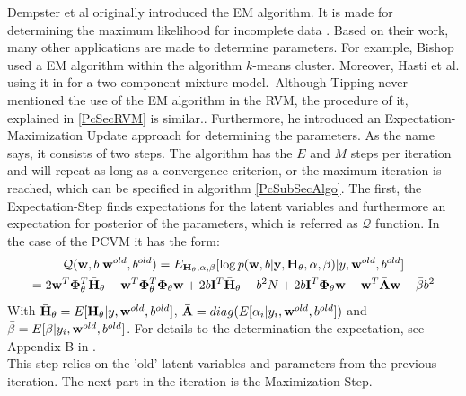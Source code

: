 Dempster et al originally introduced the EM algorithm. It is made for determining the maximum likelihood for incomplete data \cite{Dempster.1977}. 
Based on their work, many other applications are made to determine parameters.
For example, Bishop used a \acs{EM} algorithm within the algorithm $k$-means cluster.\cite[p. 426-428]{Bishop.2009}
Moreover, Hasti et al. using it in \cite[p. 272-276]{TrevorHastie.2009} for a two-component mixture model.\
Although Tipping never mentioned the use of the \acs{EM} algorithm in the \acs{RVM}, the procedure of it, explained in \ref{PcSecRVM} is similar.\cite[p. 233-234]{Tipping.2001}.
Furthermore, he introduced an Expectation-Maximization Update approach for determining the parameters.\cite[. 235]{Tipping.2001} \newline
As the name says, it consists of two steps.
The algorithm has the $E$ and $M$ steps per iteration and will repeat as long as a convergence criterion, or the maximum iteration is reached, which can be specified in algorithm \ref{PcSubSecAlgo}.
The first, the Expectation-Step finds expectations for the latent variables and furthermore an expectation for posterior of the parameters, which is referred as $\mathcal{Q}$ function.
In the case of the \acs{PCVM} it has the form:\cite{Chen.2009}
\begin{equation}\label{EqPcvmEStep}
\begin{gathered}
\mathcal{Q}(\mathbf{w},b\vert \mathbf{w}^{old},b^{old}) = E_{\mathbf{H}_{\theta},\alpha,\beta}[\log p (\mathbf{w},b \vert \mathbf{y} ,\mathbf{H}_{\theta},\alpha,\beta) | y,\mathbf{w}^{old},b^{old}]\\
= 2\mathbf{w}^T \mathbf{\Phi}_{\theta}^T \bar{\mathbf{H}}_\theta - \mathbf{w}^T \mathbf{\Phi}_{\theta}^T  \mathbf{\Phi}_{\theta} \mathbf{w} + 2b\mathbf{I}^T \bar{\mathbf{H}}_{\theta} -  b^2N + 2b\mathbf{I}^T \mathbf{\Phi}_\theta \mathbf{w}- \mathbf{w}^T\bar{\mathbf{A}}\mathbf{w} - \bar{\beta}b^2
\end{gathered}
\end{equation}
With $\mathbf{\bar{H}}_\theta =  E[\mathbf{H}_\theta \vert y, \mathbf{w}^{old}, b^{old}]$, $\mathbf{\bar{A}} = diag(E[\alpha_i|y_i,\mathbf{w}^{old},b^{old}])$ and $\bar{\beta}=E[\beta\vert y_i,\mathbf{w}^{old},b^{old}]$.
For details to the determination the expectation, see Appendix B in \cite{Chen.2009}.\\
This step relies on the 'old' latent variables and parameters from the previous iteration.
The next part in the iteration is the Maximization-Step.\cite{Chen.2009}\\
